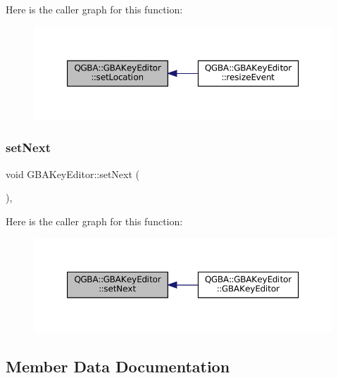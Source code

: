 Here is the caller graph for this function\+:
\nopagebreak
\begin{figure}[H]
\begin{center}
\leavevmode
\includegraphics[width=350pt]{class_q_g_b_a_1_1_g_b_a_key_editor_af41d655d8129ab4991fbb4b131705658_icgraph}
\end{center}
\end{figure}
\mbox{\label{class_q_g_b_a_1_1_g_b_a_key_editor_a47519b2e40e296040c86c6a9018645ca}} 
\subsubsection{\texorpdfstring{set\+Next}{setNext}}
{\footnotesize\ttfamily void G\+B\+A\+Key\+Editor\+::set\+Next (\begin{DoxyParamCaption}{ }\end{DoxyParamCaption})\hspace{0.3cm}{\ttfamily [private]}, {\ttfamily [slot]}}

Here is the caller graph for this function\+:
\nopagebreak
\begin{figure}[H]
\begin{center}
\leavevmode
\includegraphics[width=350pt]{class_q_g_b_a_1_1_g_b_a_key_editor_a47519b2e40e296040c86c6a9018645ca_icgraph}
\end{center}
\end{figure}


\subsection{Member Data Documentation}
\mbox{\label{class_q_g_b_a_1_1_g_b_a_key_editor_a174af89dd424fdd930c4deb2ea0238f0}} 
